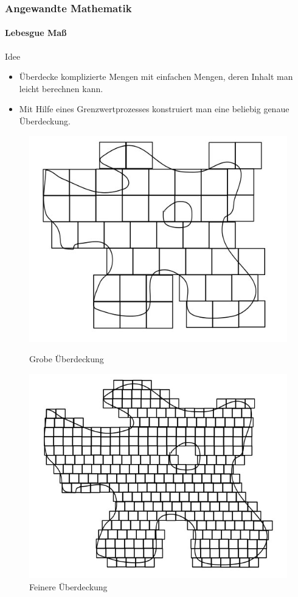 \documentclass{beamer}
\begin{document}
\begin{frame}
    \frametitle{Angewandte Mathematik}
\framesubtitle{Lebesgue Maß}
    \begin{block}{Idee}
\begin{itemize}
\item Überdecke komplizierte Mengen mit einfachen Mengen, deren Inhalt man leicht berechnen kann.
\item \pause Mit Hilfe eines Grenzwertprozesses konstruiert man eine beliebig genaue Überdeckung.
\end{itemize}
\end{block}
\begin{figure}[!tbp]
  \centering
  \begin{minipage}[b]{0.4\textwidth}
    \includegraphics[width=\textwidth]{images/leb1-2}
    \caption{Grobe Überdeckung}
  \end{minipage}
  \hfill
  \begin{minipage}[b]{0.4\textwidth}
    \includegraphics[width=\textwidth]{images/leb2-11}
    \caption{Feinere Überdeckung}
  \end{minipage}
\end{figure}
 \end{frame}
\end{document}
